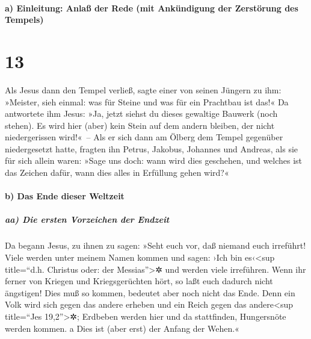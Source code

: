 \hypertarget{a-einleitung-anlauxdf-der-rede-mit-ankuxfcndigung-der-zerstuxf6rung-des-tempels}{%
\paragraph{a) Einleitung: Anlaß der Rede (mit Ankündigung der Zerstörung
des
Tempels)}\label{a-einleitung-anlauxdf-der-rede-mit-ankuxfcndigung-der-zerstuxf6rung-des-tempels}}

\hypertarget{section-12}{%
\section{13}\label{section-12}}

 Als Jesus dann den Tempel verließ, sagte einer von seinen
Jüngern zu ihm: »Meister, sieh einmal: was für Steine und was für ein
Prachtbau ist das!«  Da antwortete ihm Jesus: »Ja, jetzt
siehst du dieses gewaltige Bauwerk (noch stehen). Es wird hier (aber)
kein Stein auf dem andern bleiben, der nicht niedergerissen wird!«~--
 Als er sich dann am Ölberg dem Tempel gegenüber
niedergesetzt hatte, fragten ihn Petrus, Jakobus, Johannes und Andreas,
als sie für sich allein waren:  »Sage uns doch: wann wird
dies geschehen, und welches ist das Zeichen dafür, wann dies alles in
Erfüllung gehen wird?«

\hypertarget{b-das-ende-dieser-weltzeit}{%
\paragraph{b) Das Ende dieser
Weltzeit}\label{b-das-ende-dieser-weltzeit}}

\hypertarget{aa-die-ersten-vorzeichen-der-endzeit}{%
\subparagraph{aa) Die ersten Vorzeichen der
Endzeit}\label{aa-die-ersten-vorzeichen-der-endzeit}}

 Da begann Jesus, zu ihnen zu sagen: »Seht euch vor, daß
niemand euch irreführt!  Viele werden unter meinem Namen
kommen und sagen: ›Ich bin es‹\textless sup title=``d.h. Christus oder:
der Messias''\textgreater✲ und werden viele irreführen. 
Wenn ihr ferner von Kriegen und Kriegsgerüchten hört, so laßt euch
dadurch nicht ängstigen! Dies muß so kommen, bedeutet aber noch nicht
das Ende.  Denn ein Volk wird sich gegen das andere
erheben und ein Reich gegen das andere\textless sup title=``Jes
19,2''\textgreater✲; Erdbeben werden hier und da stattfinden,
Hungersnöte werden kommen.  a Dies ist (aber erst) der
Anfang der Wehen.«

